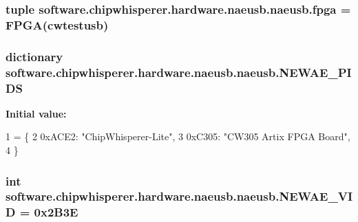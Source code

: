 \subsubsection[{fpga}]{\setlength{\rightskip}{0pt plus 5cm}tuple software.\+chipwhisperer.\+hardware.\+naeusb.\+naeusb.\+fpga = F\+P\+G\+A({\bf cwtestusb})}\label{namespacesoftware_1_1chipwhisperer_1_1hardware_1_1naeusb_1_1naeusb_a2f2a7b8ccea3423eb7132fa4fb80618f}
\hypertarget{namespacesoftware_1_1chipwhisperer_1_1hardware_1_1naeusb_1_1naeusb_a9ad6a5aa758524481b77b2673e8e1b0a}{}
\subsubsection[{N\+E\+W\+A\+E\+\_\+\+P\+I\+D\+S}]{\setlength{\rightskip}{0pt plus 5cm}dictionary software.\+chipwhisperer.\+hardware.\+naeusb.\+naeusb.\+N\+E\+W\+A\+E\+\_\+\+P\+I\+D\+S}\label{namespacesoftware_1_1chipwhisperer_1_1hardware_1_1naeusb_1_1naeusb_a9ad6a5aa758524481b77b2673e8e1b0a}
{\bfseries Initial value\+:}
\begin{DoxyCode}
1 = \{
2     0xACE2: \textcolor{stringliteral}{"ChipWhisperer-Lite"},
3     0xC305: \textcolor{stringliteral}{"CW305 Artix FPGA Board"},
4 \}
\end{DoxyCode}
\hypertarget{namespacesoftware_1_1chipwhisperer_1_1hardware_1_1naeusb_1_1naeusb_a08cfb9a196e610981a82a5510456b05b}{}
\subsubsection[{N\+E\+W\+A\+E\+\_\+\+V\+I\+D}]{\setlength{\rightskip}{0pt plus 5cm}int software.\+chipwhisperer.\+hardware.\+naeusb.\+naeusb.\+N\+E\+W\+A\+E\+\_\+\+V\+I\+D = 0x2\+B3\+E}\label{namespacesoftware_1_1chipwhisperer_1_1hardware_1_1naeusb_1_1naeusb_a08cfb9a196e610981a82a5510456b05b}
\hypertarget{namespacesoftware_1_1chipwhisperer_1_1hardware_1_1naeusb_1_1naeusb_a3d4045cbc3287c2f337d55bad870e5ec}{}
